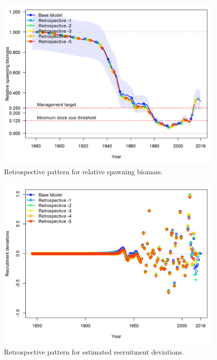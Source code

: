 \documentclass[12pt,]{article}
\begin{document}
\FloatBarrier

\begin{figure}
\centering
\includegraphics{Figures/retro_depl.png}
\caption{Retrospective pattern for relative spawning biomass.
\label{fig:retro_depl}}
\end{figure}

\FloatBarrier

\begin{figure}
\centering
\includegraphics{Figures/retro_recdevs.png}
\caption{Retrospective pattern for estimated recruitment deviations.
\label{fig:retro_recdev}}
\end{figure}
\end{document}
